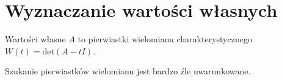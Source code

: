 \section{Wyznaczanie wartości własnych}
Wartości własne \( A \) to pierwiastki wielomianu charakterystycznego \( W(t) = \text{det}(A - tI) \). \\
\begin{warning}
	Szukanie pierwiastków wielomianu jest bardzo źle uwarunkowane.
\end{warning}
